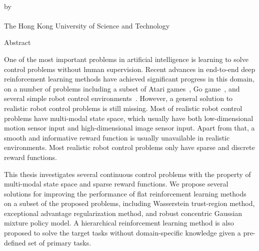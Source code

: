 \begin{center}
{\Large \thesistitle}\\
\vspace{20mm}
by \thesisauthor\\
\vspace{15mm}
\departmentname\\
\vspace{10mm}
The Hong Kong University of Science and Technology
\end{center}
\vspace{8mm}
\begin{center}
Abstract
\end{center}
One of the most important problems in artificial intelligence is learning to solve control problems without human supervision. Recent advances in end-to-end deep reinforcement learning methods have achieved significant progress in this domain, on a number of problems including a subset of Atari games~\cite{mnih2015human}, Go game~\cite{silver2016mastering}, and several simple robot control environments~\cite{duan2016benchmarking}.  However, a general solution to realistic robot control problems is still missing. Most of realistic robot control problems have multi-modal state space, which usually have both low-dimensional motion sensor input and high-dimensional image sensor input. Apart from that, a smooth and informative reward function is usually unavailable in realistic environments. Most realistic robot control problems only have sparse and discrete reward functions.

This thesis investigates several continuous control problems with the property of multi-modal state space and sparse reward functions. We propose several solutions for improving the performance of flat reinforcement learning methods on a subset of the proposed problems, including Wasserstein trust-region method, exceptional advantage regularization method, and robust concentric Gaussian mixture policy model. A hierarchical reinforcement learning method is also proposed to solve the target tasks without domain-specific knowledge given a pre-defined set of primary tasks. 

\par
\noindent


